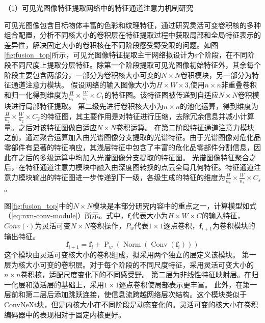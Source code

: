 \documentclass[12pt]{article}
\begin{document}
（1）可见光图像特征提取网络中的特征通道注意力机制研究

可见光图像包含目标物体丰富的色彩和纹理特征，通过研究灵活可变卷积核的多种组合配置，分析不同核大小的卷积层在特征提取过程中获取局部和全局特征表示的差异性，解决固定大小的卷积核在不同阶段感受野受限的问题。如图\ref{fig:fusion_top}所示，可见光图像特征提取主干网络拟设计为s个阶段，在不同阶段不同尺度上提取分层特征。除第一个阶段提取可见光图像初始特征外，其余每个阶段主要包含两部分，一部分为卷积核大小可变的$N \times N$卷积模块，另一部分为特征通道注意力模块。
假设网络的输入图像大小为$H\times W\times 3$,使用$n\times n $非重叠卷积和归一化得到维度为$\frac{H}{n_1} \times \frac{W}{n_1} \times C_1$的特征图。该特征图被传递到自适应$N \times N $卷积模块进行局部特征提取。
第二级先进行卷积核大小为$n \times n $的池化运算，得到维度为$\frac{H}{n_2} \times \frac{W}{n_2} \times C_2$的特征图，其主要作用是对特征进行压缩，去除冗余信息并减小计算量。之后对该特征图做自适应$N \times N $卷积运算。
在第二阶段特征通道注意力模块之前，通过聚合运算加入由光谱图像分支提取的光谱特征。由于光谱图像对危化品零部件有显著的特征响应，其浅层特征中包含了丰富的危化品零部件分割信息，因此在之后的多级运算中均加入光谱图像分支提取的特征图。
光谱图像特征聚合之后，在特征通道注意力模块中融入由深度图转换的点云全局几何特征。特征通道注意力模块输出的特征图进一步传递到下一级，各级生成的特征的维度为$\frac{H}{n_s} \times \frac{W}{n_s} \times C_s$。



图\ref{fig:fusion_top}中的$N \times N $模块是本部分研究内容中的重点之一，计算模型如式（\ref{eq:nxn-conv-module}）所示。式中，$\boldsymbol{f}_{i}$代表大小为$H \times W \times C$的输入特征，$Conv(\cdot)$为灵活可变$N\times N $卷积操作，$P_w$代表$1 \times 1$逐点卷积，$\boldsymbol{f}_{i+1}$为卷积模块的输出特征。
\begin{equation}  \boldsymbol{f}_{i+1}=\boldsymbol{f}_{i}+\operatorname{P}_{w}\left(
\operatorname{Norm}\left(\operatorname{Conv}\left(\boldsymbol{f}_{i}\right)\right)
\right)
\label{eq:nxn-conv-module}
\end{equation}
这个模块由灵活可变核大小的卷积组成，拟采用两个独立的层定义该模块。
第一层为核大小可变的卷积层。对于每个阶段的不同尺度特征，采用灵活可变大小的$n \times n$卷积核，适配尺度变化下的不同感受野。
第二层为非线性特征映射层。在归一化层和激活层的基础上，采用$1 \times 1$逐点卷积使局部表示更丰富。
此外，在第一层前和第二层后添加跳跃连接，使信息流跨越网络层次结构。这个模块类似于ConvNeXt块，但是内核大小在不同阶段是动态变化的。灵活可变的核大小在卷积编码器中的表现相对于固定内核更好。
\end{document}

